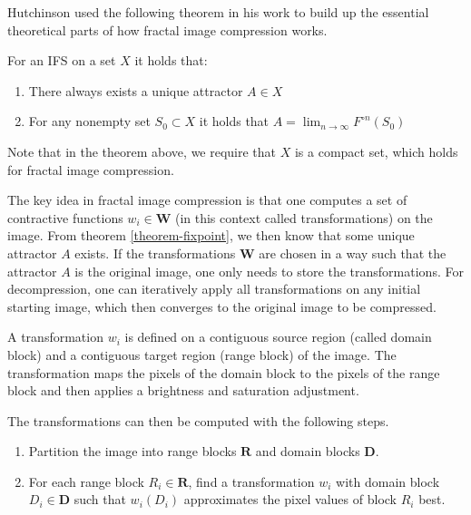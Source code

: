 Hutchinson used the following theorem in his work \cite{hutchinson1981fractals}
to build up the essential theoretical parts of how fractal image compression works.

\begin{theorem}\label{theorem-fixpoint}
  For an IFS on a set $X$ it holds that:

  \begin{enumerate}[topsep=0pt,itemsep=-1ex,partopsep=1ex,parsep=1ex]
    \item There always exists a unique attractor $A \in X$
    \item For any nonempty set $S_0 \subset X$ it holds that
      $A = \lim_{n \to \infty} F^{\circ n}(S_0)$
  \end{enumerate}
\end{theorem}

Note that in the theorem above, we require that $X$ is a compact set, which
holds for fractal image compression.


 The key idea in fractal image compression
is that one computes a set of contractive functions $w_i \in \boldsymbol{W}$ (in
this context called transformations) on the image. From theorem
\ref{theorem-fixpoint}, we then know that some unique attractor $A$ exists. If
the transformations $\boldsymbol{W}$ are chosen in a way such that the attractor
$A$ is the original image, one only needs to store the transformations. For
decompression, one can iteratively apply all transformations on any initial
starting image, which then converges to the original image to be compressed.

A transformation $w_i$ is defined on a contiguous source region (called domain
block) and a contiguous target region (range block) of the image. The
transformation maps the pixels of the domain block to the pixels of the range
block and then applies a brightness and saturation adjustment.

The transformations can then be computed with the following steps.

\begin{enumerate}[topsep=0pt,itemsep=-1ex,partopsep=1ex,parsep=1ex]
  \item Partition the image into range blocks $\boldsymbol{R}$ and domain blocks
    $\boldsymbol{D}$.
  \item For each range block $R_i \in \boldsymbol{R}$, find a transformation
    $w_i$ with domain block $D_i \in \boldsymbol{D}$ such that $w_i(D_i)$
    approximates the pixel values of block $R_i$ best.
\end{enumerate}

